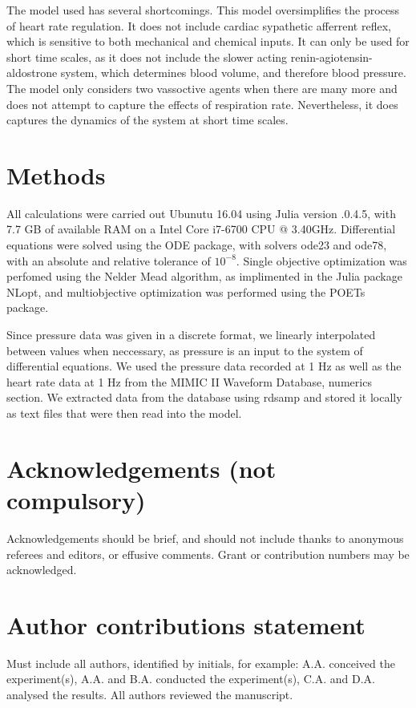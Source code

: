\documentclass[fleqn,10pt]{wlscirep}
\begin{document}
The model used has several shortcomings. This model oversimplifies the process of heart rate regulation. It does not include cardiac sypathetic afferrent reflex, which is sensitive to both mechanical and chemical inputs. \cite{du2007love} It can only be used for short time scales, as it does not include the slower acting renin-agiotensin-aldostrone system, which determines blood volume, and therefore blood pressure. \cite{boron2016medical} The model only considers two vassoctive agents when there are many more and does not attempt to capture the effects of respiration rate.  Nevertheless, it does captures the dynamics of the system at short time scales.
\section*{Methods}
All calculations were carried out Ubunutu 16.04 using Julia version .0.4.5, with 7.7 GB of available RAM on a Intel Core i7-6700 CPU @ 3.40GHz. Differential equations were solved using the ODE package, with solvers ode23 and ode78, with an absolute and relative tolerance of $10^{-8}$. Single objective optimization was perfomed using the Nelder Mead algorithm, as implimented in the Julia package NLopt, and multiobjective optimization was performed using the POETs package. 

Since pressure data was given in a discrete format, we linearly interpolated between values when neccessary, as pressure is an input to the system of differential equations. We used the pressure data recorded at 1 Hz as well as the heart rate data at 1 Hz from the MIMIC II Waveform Database, numerics section. We extracted data from the database using rdsamp and stored it locally as text files that were then read into the model.

\section*{Acknowledgements (not compulsory)}
Acknowledgements should be brief, and should not include thanks to anonymous referees and editors, or effusive comments. Grant or contribution numbers may be acknowledged.
\section*{Author contributions statement}
Must include all authors, identified by initials, for example:
A.A. conceived the experiment(s),  A.A. and B.A. conducted the experiment(s), C.A. and D.A. analysed the results.  All authors reviewed the manuscript. 
\end{document}
